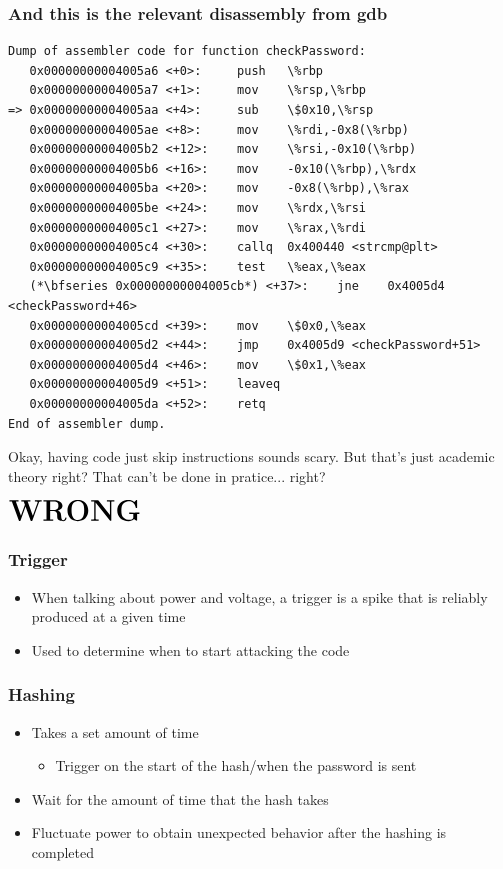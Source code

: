 \documentclass{beamer}
\begin{document}
\begin{frame}[fragile]
\frametitle{And this is the relevant disassembly from gdb}
\begin{lstlisting}
Dump of assembler code for function checkPassword:
   0x00000000004005a6 <+0>:     push   \%rbp
   0x00000000004005a7 <+1>:     mov    \%rsp,\%rbp
=> 0x00000000004005aa <+4>:     sub    \$0x10,\%rsp
   0x00000000004005ae <+8>:     mov    \%rdi,-0x8(\%rbp)
   0x00000000004005b2 <+12>:    mov    \%rsi,-0x10(\%rbp)
   0x00000000004005b6 <+16>:    mov    -0x10(\%rbp),\%rdx
   0x00000000004005ba <+20>:    mov    -0x8(\%rbp),\%rax
   0x00000000004005be <+24>:    mov    \%rdx,\%rsi
   0x00000000004005c1 <+27>:    mov    \%rax,\%rdi
   0x00000000004005c4 <+30>:    callq  0x400440 <strcmp@plt>
   0x00000000004005c9 <+35>:    test   \%eax,\%eax
   (*\bfseries 0x00000000004005cb*) <+37>:    jne    0x4005d4 <checkPassword+46>
   0x00000000004005cd <+39>:    mov    \$0x0,\%eax
   0x00000000004005d2 <+44>:    jmp    0x4005d9 <checkPassword+51>
   0x00000000004005d4 <+46>:    mov    \$0x1,\%eax
   0x00000000004005d9 <+51>:    leaveq
   0x00000000004005da <+52>:    retq
End of assembler dump.
\end{lstlisting}
\end{frame}

\begin{frame}
    \begin{center}Okay, having code just skip instructions sounds scary.
    But that's just academic theory right?
    That can't be done in pratice... right?
    \end{center}
\end{frame}

\begin{frame}
    \begin{center}$\textbf{\huge{WRONG}}$\end{center}
\end{frame}

\begin{frame}
\frametitle{Trigger}
\begin{itemize}
\item When talking about power and voltage, a trigger is a spike that is reliably produced at a given time
\item Used to determine when to start attacking the code
\end{itemize}
\end{frame}

\begin{frame}
\frametitle{Hashing}
\begin{itemize}
\item Takes a set amount of time
    \begin{itemize}
    \item Trigger on the start of the hash/when the password is sent
    \end{itemize}
\item Wait for the amount of time that the hash takes
\item Fluctuate power to obtain unexpected behavior after the hashing is completed
\end{itemize}
\end{frame}
\end{document}

